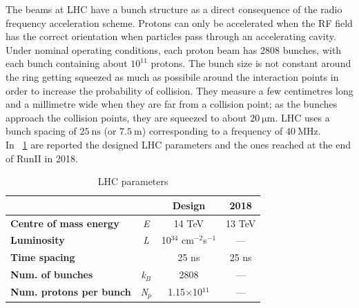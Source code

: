 The beams at LHC have a bunch structure as a direct consequence of the radio frequency acceleration scheme. Protons can only be accelerated when the RF field has the correct orientation when particles pass through an accelerating cavity. Under nominal operating conditions, each proton beam has 2808 bunches, with each bunch containing about $10^{11}$ protons. The bunch size is not constant around the ring getting squeezed as much as possibile around the interaction points in order to increase the probability of collision. They measure a few centimetres long and a millimetre wide when they are far from a collision point; as the bunches approach  the collision points, they are squeezed to about $20~\mathrm{\mu m}$. LHC uses a bunch spacing of $25~\mathrm{ns}$ (or $7.5~\mathrm{m}$) corresponding to a frequency of $40~\mathrm{MHz}$. \\
In \tablename~\ref{LHC_parameteres} are reported the designed LHC parameters and the ones reached at the end of RunII in 2018.
\begin{table}[htbp]	
	\begin{center}
		\begin{tabular}{p{6cm}*{3}{c}}
			\hline   &  & Design & 2018  \\
			\hline
			\hline
			\bfseries Centre of mass energy & \emph{E} & 14 TeV & 13 TeV \\
			\hline
			\bfseries Luminosity & \emph{L} & 10$^{34}$ cm$^{-2}$s$^{-1}$ & --- \\
			\hline
			\bfseries Time spacing &  & 25 ns & 25 ns\\
			\hline
			\bfseries Num. of bunches& \emph{k$_{B}$} & 2808 & ---\\
			\hline
			\bfseries Num. protons per bunch & \emph{N$_{p}$} & 1.15$\times$10$^{11}$ & ---\\
			\hline
			\hline
		\end{tabular}
	\end{center}
	\caption{LHC parameters}
	\label{LHC_parameteres}
\end{table}


